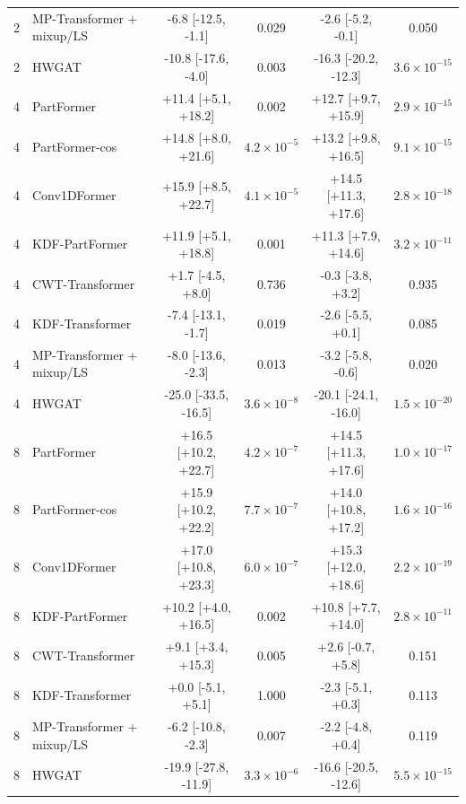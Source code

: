 \begin{table}[t]
\begin{tabular}{llcccc}
2 & MP-Transformer + mixup/LS & -6.8 [-12.5, -1.1] & 0.029 & -2.6 [-5.2, -0.1] & 0.050 \\
2 & HWGAT & -10.8 [-17.6, -4.0] & 0.003 & -16.3 [-20.2, -12.3] & $3.6\!\times\!10^{-15}$ \\
\midrule
4 & PartFormer & +11.4 [+5.1, +18.2] & 0.002 & +12.7 [+9.7, +15.9] & $2.9\!\times\!10^{-15}$ \\
4 & PartFormer-cos & +14.8 [+8.0, +21.6] & $4.2\!\times\!10^{-5}$ & +13.2 [+9.8, +16.5] & $9.1\!\times\!10^{-15}$ \\
4 & Conv1DFormer & +15.9 [+8.5, +22.7] & $4.1\!\times\!10^{-5}$ & +14.5 [+11.3, +17.6] & $2.8\!\times\!10^{-18}$ \\
4 & KDF-PartFormer & +11.9 [+5.1, +18.8] & 0.001 & +11.3 [+7.9, +14.6] & $3.2\!\times\!10^{-11}$ \\
4 & CWT-Transformer & +1.7 [-4.5, +8.0] & 0.736 & -0.3 [-3.8, +3.2] & 0.935 \\
4 & KDF-Transformer & -7.4 [-13.1, -1.7] & 0.019 & -2.6 [-5.5, +0.1] & 0.085 \\
4 & MP-Transformer + mixup/LS & -8.0 [-13.6, -2.3] & 0.013 & -3.2 [-5.8, -0.6] & 0.020 \\
4 & HWGAT & -25.0 [-33.5, -16.5] & $3.6\!\times\!10^{-8}$ & -20.1 [-24.1, -16.0] & $1.5\!\times\!10^{-20}$ \\
\midrule
8 & PartFormer & +16.5 [+10.2, +22.7] & $4.2\!\times\!10^{-7}$ & +14.5 [+11.3, +17.6] & $1.0\!\times\!10^{-17}$ \\
8 & PartFormer-cos & +15.9 [+10.2, +22.2] & $7.7\!\times\!10^{-7}$ & +14.0 [+10.8, +17.2] & $1.6\!\times\!10^{-16}$ \\
8 & Conv1DFormer & +17.0 [+10.8, +23.3] & $6.0\!\times\!10^{-7}$ & +15.3 [+12.0, +18.6] & $2.2\!\times\!10^{-19}$ \\
8 & KDF-PartFormer & +10.2 [+4.0, +16.5] & 0.002 & +10.8 [+7.7, +14.0] & $2.8\!\times\!10^{-11}$ \\
8 & CWT-Transformer & +9.1 [+3.4, +15.3] & 0.005 & +2.6 [-0.7, +5.8] & 0.151 \\
8 & KDF-Transformer & +0.0 [-5.1, +5.1] & 1.000 & -2.3 [-5.1, +0.3] & 0.113 \\
8 & MP-Transformer + mixup/LS & -6.2 [-10.8, -2.3] & 0.007 & -2.2 [-4.8, +0.4] & 0.119 \\
8 & HWGAT & -19.9 [-27.8, -11.9] & $3.3\!\times\!10^{-6}$ & -16.6 [-20.5, -12.6] & $5.5\!\times\!10^{-15}$ \\
\bottomrule
\end{tabular}
\end{table}
